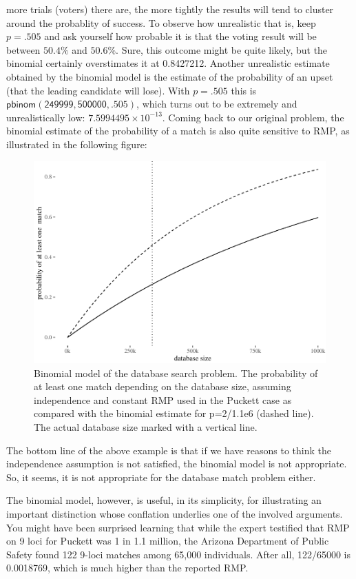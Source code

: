 \documentclass[10pt,dvipsnames,enabledeprecatedfontcommands]{scrartcl}
\begin{document}
more trials (voters) there are, the more tightly the results will tend
to cluster around the probablity of success. To observe how unrealistic
that is, keep \(p=.505\) and ask yourself how probable it is that the
voting result will be between \(50.4\%\) and \(50.6\%\). Sure, this
outcome might be quite likely, but the binomial certainly overstimates
it at 0.8427212. Another unrealistic estimate obtained by the binomial
model is the estimate of the probability of an upset (that the leading
candidate will lose). With \(p=.505\) this is
\(\mathsf{pbinom(249999,500000,.505)}\), which turns out to be extremely
and unrealistically low: \ensuremath{7.5994495\times 10^{-13}}. Coming
back to our original problem, the binomial estimate of the probability
of a match is also quite sensitive to RMP, as illustrated in the
following figure:

\begin{figure}

{\centering \includegraphics[width=0.8\linewidth]{lr-chapter_files/figure-latex/puckett-1} 

}

\caption{Binomial model of the database search problem. The probability of at least one match depending on the database size, assuming independence and constant RMP used in  the Puckett case as compared with the binomial estimate for p=2/1.1e6 (dashed line). The actual database size marked with a vertical line.}\label{fig:puckett}
\end{figure}

The bottom line of the above example is that if we have reasons to think
the independence assumption is not satisfied, the binomial model is not
appropriate. So, it seems, it is not appropriate for the database match
problem either.

The binomial model, however, is useful, in its simplicity, for
illustrating an important distinction whose conflation underlies one of
the involved arguments. You might have been surprised learning that
while the expert testified that RMP on 9 loci for Puckett was 1 in 1.1
million, the Arizona Department of Public Safety found 122 9-loci
matches among 65,000 individuals. After all, 122/65000 is 0.0018769,
which is much higher than the reported RMP.
\end{document}
